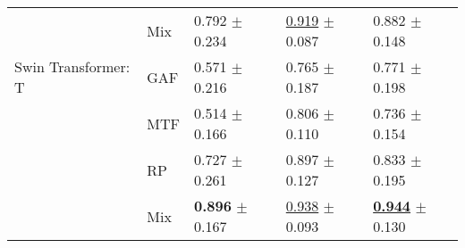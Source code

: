 \begin{tabular}[t]{lllll}
 & Mix & \textcolor[rgb]{0.2631578947,0.5000000000,0}{0.792} $\pm$ \textcolor[rgb]{0.8975274679,0.1024725321,0}{0.234} & \underline{\textcolor[rgb]{0.1342281879,0.5000000000,0}{0.919}} $\pm$ \textcolor[rgb]{0.0070767442,0.5000000000,0}{0.087} & \textcolor[rgb]{0.2903225806,0.5000000000,0}{0.882} $\pm$ \textcolor[rgb]{0.2839645945,0.5000000000,0}{0.148} \\
Swin Transformer: T & GAF & \textcolor[rgb]{0.8210526316,0.1789473684,0}{0.571} $\pm$ \textcolor[rgb]{0.8264717512,0.1735282488,0}{0.216} & \textcolor[rgb]{1.0000000000,0.0000000000,0}{0.765} $\pm$ \textcolor[rgb]{1.0000000000,0.0000000000,0}{0.187} & \textcolor[rgb]{0.8064516129,0.1935483871,0}{0.771} $\pm$ \textcolor[rgb]{1.0000000000,0.0000000000,0}{0.198} \\
 & MTF & \textcolor[rgb]{0.9649122807,0.0350877193,0}{0.514} $\pm$ \textcolor[rgb]{0.6358623968,0.3641376032,0}{0.166} & \textcolor[rgb]{0.7740492170,0.2259507830,0}{0.806} $\pm$ \textcolor[rgb]{0.2381568728,0.5000000000,0}{0.110} & \textcolor[rgb]{0.9677419355,0.0322580645,0}{0.736} $\pm$ \textcolor[rgb]{0.3664854198,0.5000000000,0}{0.154} \\
 & RP & \textcolor[rgb]{0.4258373206,0.5000000000,0}{0.727} $\pm$ \textcolor[rgb]{1.0000000000,0.0000000000,0}{0.261} & \textcolor[rgb]{0.2595078300,0.5000000000,0}{0.897} $\pm$ \textcolor[rgb]{0.3997711176,0.5000000000,0}{0.127} & \textcolor[rgb]{0.5161290323,0.4838709677,0}{0.833} $\pm$ \textcolor[rgb]{0.9479826970,0.0520173030,0}{0.195} \\
 & Mix & \textbf{\textcolor[rgb]{0.0000000000,0.5000000000,0}{0.896}} $\pm$ \textcolor[rgb]{0.6400954790,0.3599045210,0}{0.167} & \underline{\textcolor[rgb]{0.0268456376,0.5000000000,0}{0.938}} $\pm$ \textcolor[rgb]{0.0643680321,0.5000000000,0}{0.093} & \underline{\textbf{\textcolor[rgb]{0.0000000000,0.5000000000,0}{0.944}}} $\pm$ \textcolor[rgb]{0.0146408820,0.5000000000,0}{0.130} \\
\bottomrule
\end{tabular}

